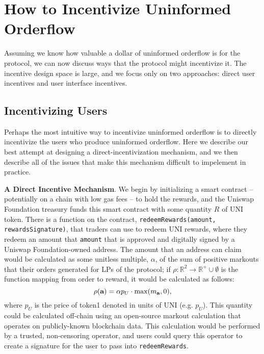 \section{How to Incentivize Uninformed Orderflow} \label{section:how-to-incentivize}

Assuming we know how valuable a dollar of uninformed orderflow is for the protocol, we can now discuss ways that the protocol might incentivize it. 
The incentive design space is large, and we focus only on two approaches: direct user incentives and user interface incentives.

\subsection{Incentivizing Users} \label{subsection:direct-incentives}
    Perhaps the most intuitive way to incentivize uninformed orderflow is to directly incentivize the users who produce uninformed orderflow. %
    Here we describe our best attempt at designing a direct-incentivization mechanism, and we then describe all of the issues that make this mechanism difficult to impelement in practice.

    \textbf{A Direct Incentive Mechanism}.
    We begin by initializing a smart contract -- potentially on a chain with low gas fees -- to hold the rewards, and the Uniswap Foundation treasury funds this smart contract with some quantity $R$ of UNI token. There is a function on the contract, \texttt{redeemRewards(amount, rewardsSignature)}, that traders can use to redeem UNI rewards, where they redeem an amount that \texttt{amount} that is approved and digitally signed by a Uniswap Foundation-owned address. The amount that an address can claim would be calculated as some unitless multiple, $\alpha$, of the sum of positive markouts that their orders generated for LPs of the protocol; if $\rho: \mathbb R^2 \rightarrow \mathbb R^+ \cup \emptyset$ is the function mapping from order to reward, it would be calculated as follows:
        \begin{equation}
            \rho(\textbf a) = \alpha p_U \cdot \max(m_{\textbf a}, 0),
        \end{equation}
    where $p_U$ is the price of token1 denoted in units of UNI (e.g. $p_U$).
    This quantity could be calculated off-chain using an open-source markout calculation that operates on publicly-known blockchain data. This calculation would be performed by a trusted, non-censoring operator, and users could query this operator to create a signature for the user to pass into \texttt{redeemRewards}.


